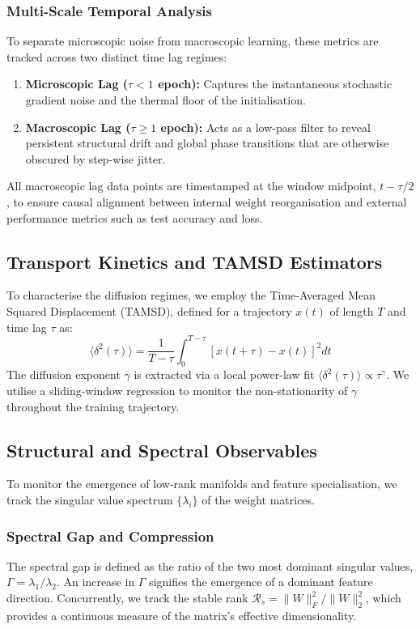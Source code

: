 \documentclass[11pt,a4paper]{article}
\begin{document}
\subsubsection{Multi-Scale Temporal Analysis}
To separate microscopic noise from macroscopic learning, these metrics are tracked across two distinct time lag regimes:
\begin{enumerate}
    \item \textbf{Microscopic Lag ($\tau < 1$ epoch):} Captures the instantaneous stochastic gradient noise and the thermal floor of the initialisation.
    \item \textbf{Macroscopic Lag ($\tau \geq 1$ epoch):} Acts as a low-pass filter to reveal persistent structural drift and global phase transitions that are otherwise obscured by step-wise jitter.
\end{enumerate}

All macroscopic lag data points are timestamped at the window midpoint, $t - \tau/2$, to ensure causal alignment between internal weight reorganisation and external performance metrics such as test accuracy and loss.

\subsection{Transport Kinetics and TAMSD Estimators}
To characterise the diffusion regimes, we employ the Time-Averaged Mean Squared Displacement (TAMSD), defined for a trajectory $x(t)$ of length $T$ and time lag $\tau$ as:
\begin{equation}
	\langle \delta^2(\tau) \rangle = \frac{1}{T-\tau} \int_0^{T-\tau} [x(t+\tau) - x(t)]^2 dt
\end{equation}
The diffusion exponent $\gamma$ is extracted via a local power-law fit $\langle \delta^2(\tau) \rangle \propto \tau^\gamma$. We utilise a sliding-window regression to monitor the non-stationarity of $\gamma$ throughout the training trajectory.
\subsection{Structural and Spectral Observables}
To monitor the emergence of low-rank manifolds and feature specialisation, we track the singular value spectrum $\{\lambda_i\}$ of the weight matrices.

\subsubsection{Spectral Gap and Compression}
The spectral gap is defined as the ratio of the two most dominant singular values, $\Gamma = \lambda_1 / \lambda_2$. An increase in $\Gamma$ signifies the emergence of a dominant feature direction. Concurrently, we track the stable rank $\mathcal{R}_s = \|W\|_F^2 / \|W\|_2^2$, which provides a continuous measure of the matrix's effective dimensionality.
\end{document}
